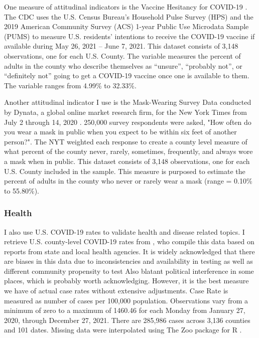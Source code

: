 

One measure of attitudinal indicators is the Vaccine Hesitancy for COVID-19
\citep{vaches_data}. The CDC uses the U.S. Census Bureau’s Household Pulse
Survey (HPS) and the 2019 American Community Survey (ACS) 1-year Public Use
Microdata Sample (PUMS) to measure U.S. residents’ intentions to receive the
COVID-19 vaccine if available during May 26, 2021 – June 7, 2021. This dataset
consists of 3,148 observations, one for each U.S. County. The variable measures
the percent of adults in the county who describe themselves as “unsure”,
“probably not”, or “definitely not” going to get a COVID-19 vaccine once one is
available to them. The variable ranges from 4.99\% to 32.33\%.

Another attitudinal indicator I use is the Mask-Wearing Survey Data conducted by
Dynata, a global online market research firm, for the New York Times from July 2
through 14, 2020 \citep{mask_data}. 250,000 survey respondents were asked, "How
often do you wear a mask in public when you expect to be within six feet of
another person?". The NYT weighted each response to create a county level
measure of what percent of the county never, rarely, sometimes, frequently, and
always wore a mask when in public. This dataset consists of 3,148 observations,
one for each U.S. County included in the sample. This measure is purposed to
estimate the percent of adults in the county who never or rarely wear a mask
(range = 0.10\% to 55.80\%).

\subsubsection{Health}

I also use U.S. COVID-19 rates to validate health and disease related topics. I
retrieve U.S. county-level COVID-19 rates from \citet{covid_data}, who compile
this data based on reports from state and local health agencies. It is widely
acknowledged that there are biases in this data due to inconsistencies and
availability in testing as well as different community propensity to test %
Also blatant political interference in some places, which is probably worth
acknowledging. \citep{gu22, cdc20a} However, it is the best measure we have of
actual case rates without extensive adjustments. Case Rate is measured as number
of cases per 100,000 population. Observations vary from a minimum of zero to a
maximum of 1460.46 for each Monday from January 27, 2020, through December 27,
2021. There are 285,986 cases across 3,136 counties and 101 dates. Missing data
were interpolated using The Zoo package for R \citep{zoo}.


